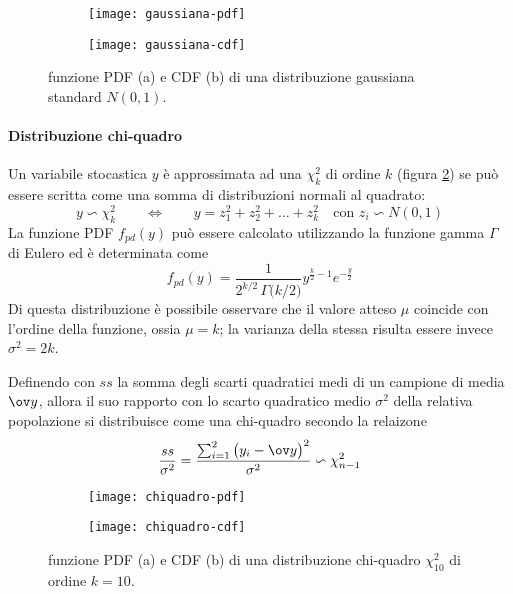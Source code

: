 		
		\begin{figure}[bht]
			\centering
			\begin{subfigure}{0.48\linewidth}
				\centering
				\texttt{[image: gaussiana-pdf]} \caption{}
			\end{subfigure}
			\begin{subfigure}{0.48\linewidth}
				\centering
				\texttt{[image: gaussiana-cdf]} \caption{}
			\end{subfigure}
			\caption{funzione PDF (a) e CDF (b) di una distribuzione gaussiana standard $N(0,1)$.}
			\label{fig:stat:gaussiana}
		\end{figure}
		
		\paragraph{Distribuzione chi-quadro} Un variabile stocastica $y$ è approssimata ad una  $\chi^2_k$ di ordine $k$ (figura \ref{fig:stat:chiquadro}) se può essere scritta come una somma di distribuzioni normali al quadrato:
		\begin{equation}
			y \backsim \chi_k^2 \qquad \Leftrightarrow \qquad y = z_1^2 + z_2^2 + \dots + z_k^2 \quad \textrm{con } z_i\backsim N(0,1)
		\end{equation}
		La funzione PDF $f_{pd}(y)$ può essere calcolato utilizzando la funzione gamma $\Gamma$ di Eulero ed è determinata come
		\begin{equation}
			f_{pd}(y) = \frac 1 {2^{k/2} \, \Gamma \big(k/2\big) } y ^{\frac k 2 - 1} e^{-\frac y 2}
		\end{equation}
		Di questa distribuzione è possibile osservare che il valore atteso $\mu$ coincide con l'ordine della funzione, ossia $\mu = k$; la varianza della stessa risulta essere invece $\sigma^2 = 2k$.
		
		Definendo con $ss$ la somma degli scarti quadratici medi di un campione di media $\ov y$, allora il suo rapporto con lo scarto quadratico medio $\sigma^2$ della relativa popolazione si distribuisce come una chi-quadro secondo la relaizone
		\begin{equation}
			\frac{ss}{\sigma^2} = \frac{\sum_{i=1}^2 \big(y_i-\ov y\big)^2}{\sigma^2} \backsim \chi_{n-1}^2
		\end{equation}
		
		\begin{figure}[bht]
			\centering
			\begin{subfigure}{0.48\linewidth}
				\centering
				\texttt{[image: chiquadro-pdf]} \caption{}
			\end{subfigure}
			\begin{subfigure}{0.48\linewidth}
				\centering
				\texttt{[image: chiquadro-cdf]} \caption{}
			\end{subfigure}
			\caption{funzione PDF (a) e CDF (b) di una distribuzione chi-quadro $\chi^2_{10}$ di ordine $k=10$.}
			\label{fig:stat:chiquadro}
		\end{figure}
		
